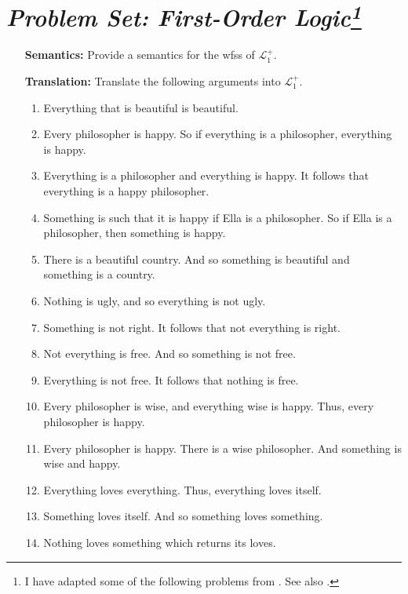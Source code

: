 \documentclass[a4paper, 11pt]{article} %
\renewcommand{\L}[0]{\mathcal{L}}
\begin{document}
\section*{\it Problem Set: First-Order Logic\footnote{I have adapted some of the following problems from \citet{Carr2013}. See also \citet{Halbach2010}.}}

\begin{enumerate}[leftmargin=1.2in,labelsep=.15in] 
\item[\bf Semantics:] Provide a semantics for the wfss of $\L^+_1$.
\item[\bf Translation:] Translate the following arguments into $\L_1^+$.
	\begin{enumerate}[label=(\arabic*)]\small
	\item Everything that is beautiful is beautiful.
	\item Every philosopher is happy. So if everything is a philosopher, everything is happy.
	\item Everything is a philosopher and everything is happy. It follows that everything is a happy philosopher.
	\item Something is such that it is happy if Ella is a philosopher. So if Ella is a philosopher, then something is happy. 
	\item There is a beautiful country. And so something is beautiful and something is a country.
	\item Nothing is ugly, and so everything is not ugly.
	\item Something is not right. It follows that not everything is right.
	\item Not everything is free. And so something is not free.
	\item Everything is not free. It follows that nothing is free.
	\item Every philosopher is wise, and everything wise is happy. Thus, every philosopher is happy.
	\item Every philosopher is happy. There is a wise philosopher. And something is wise and happy.
	\item Everything loves everything. Thus, everything loves itself.
	\item Something loves itself. And so something loves something.
	\item Nothing loves something which returns its loves.

\end{enumerate}
\end{enumerate}
\end{document}
